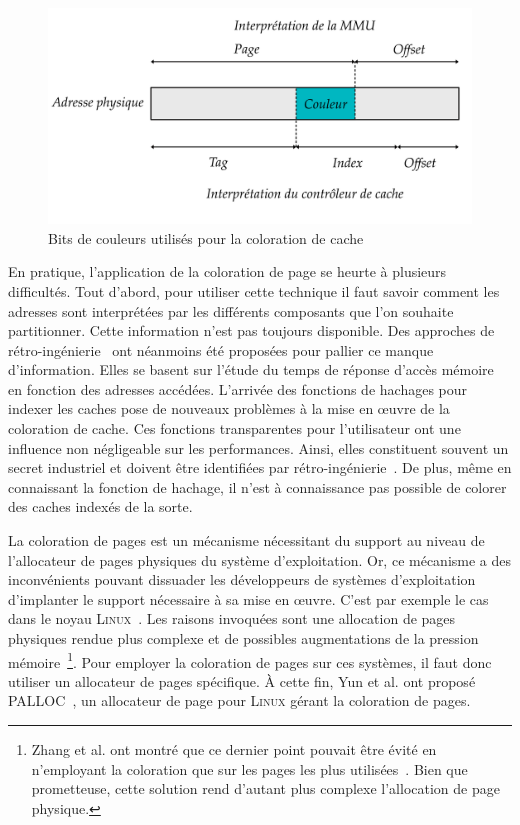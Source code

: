 \begin{figure}
	\centering
	\includegraphics[width=0.65\linewidth]{graphics/figures/coloring.pdf}
	\caption{\label{fig:coloring}Bits de couleurs utilisés pour la coloration de cache}
\end{figure}


En pratique, l'application de la coloration de page se heurte à plusieurs difficultés.
Tout d'abord, pour utiliser cette technique il faut savoir comment les adresses sont interprétées par les différents composants que l'on souhaite partitionner.
Cette information n'est pas toujours disponible.
Des approches de rétro-ingénierie~\cite{yun2014palloc,panchamukhi_providing_2015} ont néanmoins été proposées pour pallier ce manque d'information.
Elles se basent sur l'étude du temps de réponse d'accès mémoire en fonction des adresses accédées.
L'arrivée des fonctions de hachages pour indexer les caches pose de nouveaux problèmes à la mise en œuvre de la coloration de cache.
Ces fonctions transparentes pour l'utilisateur ont une influence non négligeable sur les performances.
Ainsi, elles constituent souvent un secret industriel et doivent être identifiées par rétro-ingénierie~\cite{yarom2015mapping}.
De plus, même en connaissant la fonction de hachage, il n'est à connaissance pas possible de colorer des caches indexés de la sorte.

La coloration de pages est un mécanisme nécessitant du support au niveau de l'allocateur de pages physiques du système d'exploitation.
Or, ce mécanisme a des inconvénients pouvant dissuader les développeurs de systèmes d'exploitation d'implanter le support nécessaire à sa mise en œuvre.
C'est par exemple le cas dans le noyau \textsc{Linux}~\cite{torvald2003coloring}.
Les raisons invoquées sont une allocation de pages physiques rendue plus complexe et de possibles augmentations de la pression mémoire~\footnote{Zhang et al. ont montré que ce dernier point pouvait être évité en n'employant la coloration que sur les pages les plus utilisées~\cite{zhang2009towards}. Bien que prometteuse, cette solution rend d'autant plus complexe l'allocation de page physique.}.
Pour employer la coloration de pages sur ces systèmes, il faut donc utiliser un allocateur de pages spécifique.
À cette fin, Yun et al. ont proposé \textsc{PALLOC}~\cite{yun2014palloc}, un allocateur de page pour \textsc{Linux} gérant la coloration de pages.


